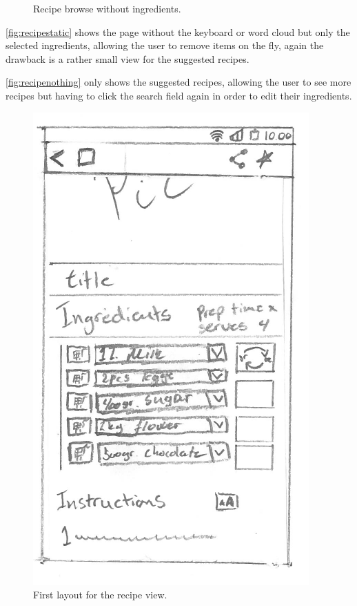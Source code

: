 \begin{figure}[H]
\begin{minipage}[b]{0.5\columnwidth}
\caption{Recipe browse without ingredients\label{fig:recipenothing}.}
\end{minipage}
\end{figure}

\autoref{fig:recipestatic} shows the page without the keyboard or word cloud but only the selected ingredients, allowing the user to remove items on the fly, again the drawback is a rather small view for the suggested recipes.

\autoref{fig:recipenothing} only shows the suggested recipes, allowing the user to see more recipes but having to click the search field again in order to edit their ingredients.

\begin{figure}[H]
\begin{minipage}[t]{0.5\columnwidth}
\centering
\includegraphics[width=0.7\columnwidth]{img/prototypes/recipe_old.pdf}
\caption{First layout for the recipe view\label{fig:recipeold}.}
\end{minipage}
\hspace{0.5cm}
\begin{minipage}[t]{0.5\columnwidth}

\end{minipage}
\end{figure}
